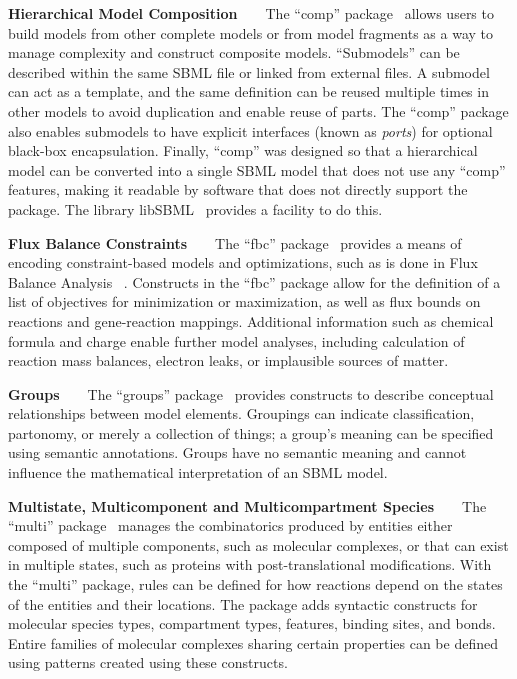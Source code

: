 \documentclass{sbml-paper}
\begin{document}
\textbf{Hierarchical Model Composition}~~~~The ``comp'' package~\citep{Smith2015} allows users to build models from other complete models or from model fragments as a way to manage complexity and construct composite models. ``Submodels'' can be described within the same SBML file or linked from external files. A submodel can act as a template, and the same definition can be reused multiple times in other models to avoid duplication and enable reuse of parts. The ``comp'' package also enables submodels to have explicit interfaces (known as \emph{ports}) for optional black-box encapsulation. Finally, ``comp'' was designed so that a hierarchical model can be converted into a single SBML model that does not use any ``comp'' features,  making it readable by software that does not directly support the package. The library libSBML~\citep{bornstein2008libsbml} provides a facility to do this.

\textbf{Flux Balance Constraints}~~~~The ``fbc'' package~\citep{Olivier2018a} provides a means of encoding constraint-based models and optimizations, such as is done in Flux Balance Analysis ~\citep{Bordbar2014a}.  Constructs in the ``fbc'' package allow for the definition of a list of objectives for minimization or maximization, as well as flux bounds on reactions and gene-reaction mappings. Additional information such as chemical formula and charge enable further model analyses, including calculation of reaction mass balances, electron leaks, or implausible sources of matter.  

\textbf{Groups}~~~~The ``groups'' package~\citep{hucka2016sbml} provides constructs to describe conceptual relationships between model elements. Groupings can indicate classification, partonomy, or merely a collection of things; a group's meaning can be specified using semantic annotations.  Groups have no semantic meaning and cannot influence the mathematical interpretation of an SBML model.

\textbf{Multistate, Multicomponent and Multicompartment Species}~~~~The ``multi'' package~\citep{zhang2018multi} manages the combinatorics produced by entities either composed of multiple components, such as molecular complexes, or that can exist in multiple states, such as proteins with post-translational modifications. With the ``multi'' package, rules can be defined for how reactions depend on the states of the entities and their locations. The package adds syntactic constructs for molecular species types, compartment types, features, binding sites, and bonds.  Entire families of molecular complexes sharing certain properties can be defined using patterns created using these constructs.
\end{document}
